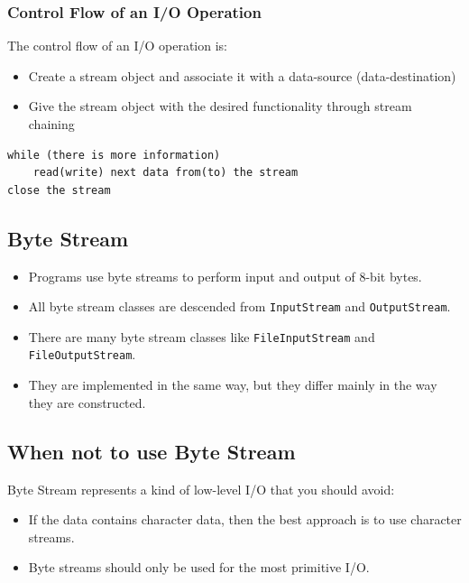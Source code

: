 \documentclass[11pt,a4paper]{article}
\begin{document}
\subsubsection*{Control Flow of an I/O Operation}
The control flow of an I/O operation is:
\begin{itemize}
    \item Create a stream object and associate it with a data-source (data-destination) 
    \item Give the stream object with the desired functionality through stream chaining 
\end{itemize}
\begin{lstlisting}[numbers=none]
while (there is more information) 
    read(write) next data from(to) the stream 
close the stream
\end{lstlisting}

\subsection*{Byte Stream}
\begin{itemize}
    \item Programs use byte streams to perform input and output of 8-bit bytes. 
    \item All byte stream classes are descended from \texttt{InputStream} and \texttt{OutputStream}. 
    \item There are many byte stream classes like \texttt{FileInputStream} and \texttt{FileOutputStream}. 
    \item They are implemented in the same way, but they differ mainly in the way they are constructed. 
\end{itemize}

\subsection*{When not to use Byte Stream}

Byte Stream represents a kind of low-level I/O that you should avoid: 
\begin{itemize}
    \item If the data contains character data, then the best approach is to use character streams.  
    \item Byte streams should only be used for the most primitive I/O. 
\end{itemize}
\end{document}
